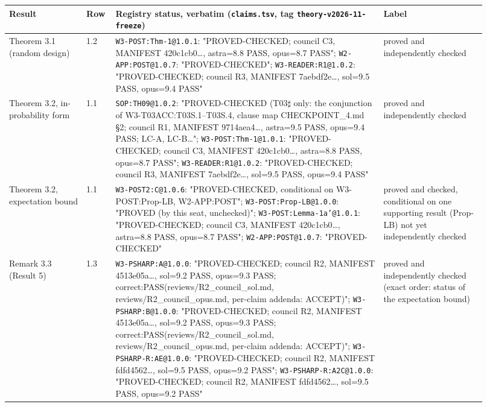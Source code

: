 \begingroup\footnotesize\sloppy
\begin{longtable}{@{}p{0.15\linewidth}p{0.05\linewidth}p{0.52\linewidth}p{0.2\linewidth}@{}}
\toprule Result & Row & Registry status, verbatim (\texttt{claims.tsv}, tag \texttt{theory-v2026-11-freeze}) & Label \\ \midrule \endhead
Theorem 3.1 (random design) & 1.2 & \texttt{W3-POST:Thm-1@1.0.1}: "PROVED-CHECKED; council C3, MANIFEST 420c1cb0\ldots{}, astra=8.8 PASS, opus=8.7 PASS"; \texttt{W2-APP:POST@1.0.7}: "PROVED-CHECKED"; \texttt{W3-READER:R1@1.0.2}: "PROVED-CHECKED; council R3, MANIFEST 7aebdf2e\ldots{}, sol=9.5 PASS, opus=9.4 PASS" & proved and independently checked \\
Theorem 3.2, in-probability form & 1.1 & \texttt{SOP:TH09@1.0.2}: "PROVED-CHECKED (T03$\sharp$ only: the conjunction of W3-T03ACC:T03S.1--T03S.4, clause map CHECKPOINT\_4.md §2; council R1, MANIFEST 9714aea4\ldots{}, astra=9.5 PASS, opus=9.4 PASS; LC-A, LC-B\ldots{}"; \texttt{W3-POST:Thm-1@1.0.1}: "PROVED-CHECKED; council C3, MANIFEST 420c1cb0\ldots{}, astra=8.8 PASS, opus=8.7 PASS"; \texttt{W3-READER:R1@1.0.2}: "PROVED-CHECKED; council R3, MANIFEST 7aebdf2e\ldots{}, sol=9.5 PASS, opus=9.4 PASS" & proved and independently checked \\
Theorem 3.2, expectation bound & 1.1 & \texttt{W3-POST2:C@1.0.6}: "PROVED-CHECKED, conditional on W3-POST:Prop-LB, W2-APP:POST"; \texttt{W3-POST:Prop-LB@1.0.0}: "PROVED (by this seat, unchecked)"; \texttt{W3-POST:Lemma-1a'@1.0.1}: "PROVED-CHECKED; council C3, MANIFEST 420c1cb0\ldots{}, astra=8.8 PASS, opus=8.7 PASS"; \texttt{W2-APP:POST@1.0.7}: "PROVED-CHECKED" & proved and checked, conditional on one supporting result (Prop-LB) not yet independently checked \\
Remark 3.3 (Result 5) & 1.3 & \texttt{W3-PSHARP:A@1.0.0}: "PROVED-CHECKED; council R2, MANIFEST 4513e05a\ldots{}, sol=9.2 PASS, opus=9.3 PASS; correct:PASS(reviews/R2\_council\_sol.md, reviews/R2\_council\_opus.md, per-claim addenda: ACCEPT)"; \texttt{W3-PSHARP:B@1.0.0}: "PROVED-CHECKED; council R2, MANIFEST 4513e05a\ldots{}, sol=9.2 PASS, opus=9.3 PASS; correct:PASS(reviews/R2\_council\_sol.md, reviews/R2\_council\_opus.md, per-claim addenda: ACCEPT)"; \texttt{W3-PSHARP-R:AE@1.0.0}: "PROVED-CHECKED; council R2, MANIFEST fdfd4562\ldots{}, sol=9.5 PASS, opus=9.2 PASS"; \texttt{W3-PSHARP-R:A2C@1.0.0}: "PROVED-CHECKED; council R2, MANIFEST fdfd4562\ldots{}, sol=9.5 PASS, opus=9.2 PASS" & proved and independently checked (exact order: status of the expectation bound) \\

\end{longtable}

